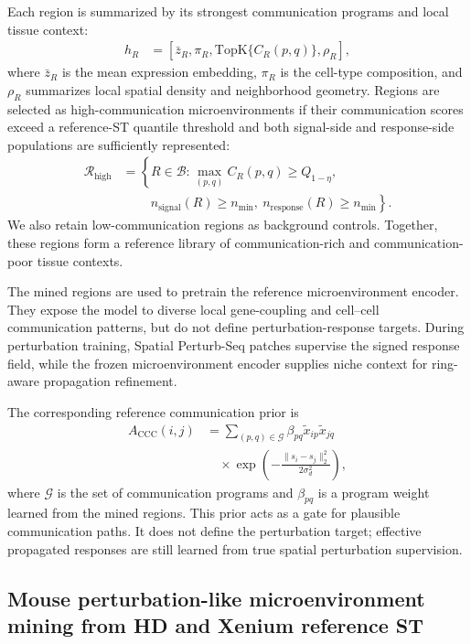 \documentclass[sigconf,review,balance=false]{acmart}
\begin{document}
Each region is summarized by its strongest communication programs and local tissue context:
\[
\begin{aligned}
h_R
&=
[\bar z_R,\pi_R,\mathrm{TopK}\{C_R(p,q)\},\rho_R],
\end{aligned}
\]
where $\bar z_R$ is the mean expression embedding, $\pi_R$ is the cell-type composition, and $\rho_R$ summarizes local spatial density and neighborhood geometry. Regions are selected as high-communication microenvironments if their communication scores exceed a reference-ST quantile threshold and both signal-side and response-side populations are sufficiently represented:
\[
\begin{aligned}
\mathcal R_{\mathrm{high}}
&=
\left\{
R\in\mathcal B:
\max_{(p,q)}C_R(p,q)\ge Q_{1-\eta},
\right.\\
&\qquad\left.
\ n_{\mathrm{signal}}(R)\ge n_{\min},
\ n_{\mathrm{response}}(R)\ge n_{\min}
\right\}.
\end{aligned}
\]
We also retain low-communication regions as background controls. Together, these regions form a reference library of communication-rich and communication-poor tissue contexts.

The mined regions are used to pretrain the reference microenvironment encoder. They expose the model to diverse local gene-coupling and cell--cell communication patterns, but do not define perturbation-response targets. During perturbation training, Spatial Perturb-Seq patches supervise the signed response field, while the frozen microenvironment encoder supplies niche context for ring-aware propagation refinement.

The corresponding reference communication prior is
\[
\begin{aligned}
A_{\mathrm{CCC}}(i,j)
&=
\sum_{(p,q)\in\mathcal G}
\beta_{pq}
\tilde x_{ip}\tilde x_{jq}\\
&\quad \times
\exp\!\left(
-\frac{\|s_i-s_j\|_2^2}{2\sigma_d^2}
\right),
\end{aligned}
\]
where $\mathcal G$ is the set of communication programs and $\beta_{pq}$ is a program weight learned from the mined regions. This prior acts as a gate for plausible communication paths. It does not define the perturbation target; effective propagated responses are still learned from true spatial perturbation supervision.

\subsection{Mouse perturbation-like microenvironment mining from HD and Xenium reference ST}
\label{app:mouse_microenvironment_mining}
\end{document}
